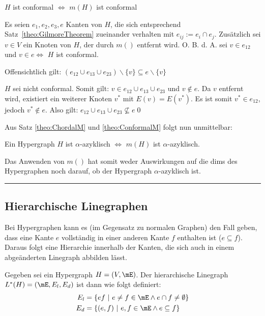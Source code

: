 \begin{Theorem}\label{theo:ConformalM}
$H$ ist conformal $\Leftrightarrow$ $m(H)$ ist conformal
\end{Theorem}

\begin{Proof}
Es seien $e_1,e_2,e_3,e$ Kanten von $H$, die sich entsprechend Satz~\ref{theo:GilmoreTheorem} zueinander verhalten mit $e_{ij}:=e_i\cap e_j$. Zusätzlich sei $v\in V$ ein Knoten von $H$, der durch $m()$ entfernt wird. O. B. d. A. sei $v \in e_{12}$ und $v\in e \Leftrightarrow$ $H$ ist conformal.

\prR
Offensichtlich gilt:
$(e_{12} \cup e_{13} \cup e_{23})\backslash\{v\} \subseteq e\backslash\{v\}$

\prL
$H$ sei nicht conformal. Somit gilt: $v\in e_{12} \cup e_{13} \cup e_{23} $ und $v\notin e$. Da $v$ entfernt wird, existiert ein weiterer Knoten $v^*$ mit $E(v)=E(v^*)$. Es ist somit $v^*\in e_{12}$, jedoch $v^*\notin e$. Also gilt:
$e_{12} \cup e_{13} \cup e_{23}\nsubseteq e$\qed
\end{Proof}

Aus Satz \ref{theo:ChordalM} und \ref{theo:ConformalM} folgt nun unmittelbar:

\begin{Theorem}Ein Hypergraph $H$ ist $\alpha$-azyklisch $\Leftrightarrow$ $m(H)$ ist $\alpha$-azyklisch.
\end{Theorem}

Das Anwenden von $m()$ hat somit weder Auswirkungen auf die dims des Hypergraphen noch darauf, ob der Hypergraph $\alpha$-azyklisch ist.


\rule{\linewidth}{1pt}
\clearpage


\subsection{Hierarchische Linegraphen}
Bei Hypergraphen kann es (im Gegensatz zu normalen Graphen) den Fall geben, dass eine Kante $e$ vollständig in einer anderen Kante $f$ enthalten ist ($e\subseteq f$). Daraus folgt eine Hierarchie innerhalb der Kanten, die sich auch in einem abgeänderten Linegraph abbilden lässt.

\begin{mydef}
Gegeben sei ein Hypergraph $H=(V,\mE)$. Der hierarchische Linegraph $L^*(H)=(\mE,E_l,E_d)$ ist dann wie folgt definiert:
\begin{align*}
E_l &= \{ef\ |\ e\neq f\in\mE  \wedge e\cap f\neq\emptyset \} \\
E_d &= \{(e,f)\ |\ e,f\in\mE  \wedge e \subseteq f \}
\end{align*}
\end{mydef}

